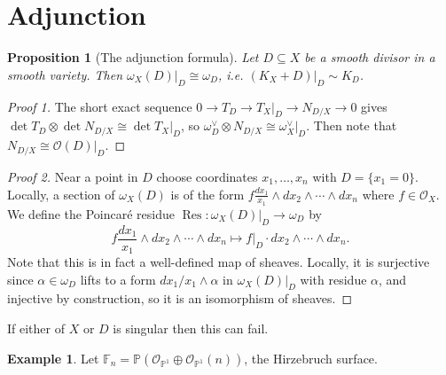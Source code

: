 \documentclass{article}
\newtheorem*{proposition}{Proposition}
\theoremstyle{definition}
\newtheorem*{example}{Example}
\DeclareMathOperator{\Res}{Res}
\renewcommand{\O}{\mathcal{O}}
\renewcommand{\P}{\mathbb{P}}
\newcommand{\F}{\mathbb{F}}
\begin{document}
\section*{Adjunction}

\begin{proposition}[The adjunction formula]
    Let $D\subseteq X$ be a smooth divisor in a smooth variety. Then
    $\omega_X(D)|_D\cong\omega_D$, i.e. $(K_X+D)|_D\sim K_D$.
\end{proposition}

\begin{proof}[Proof 1]
    The short exact sequence $0\to T_D\to T_X|_D\to N_{D/X}\to0$ gives
    $\det T_D\otimes\det N_{D/X}\cong\det T_X|_D$, so
    $\omega_D^\vee\otimes N_{D/X}\cong \omega_X^\vee|_D$. Then note that
    $N_{D/X}\cong\O(D)|_D$.
\end{proof}

\begin{proof}[Proof 2]
    Near a point in $D$ choose coordinates $x_1,\ldots,x_n$ with $D=\{x_1=0\}$.
    Locally, a section of $\omega_X(D)$ is of the form
    $f\frac{dx_1}{x_1}\wedge dx_2\wedge\cdots\wedge dx_n$ where $f\in\O_X$. We
    define the Poincar\'e residue $\Res:\omega_X(D)|_D\to\omega_D$ by
    \begin{equation*}
        f\frac{dx_1}{x_1}\wedge dx_2\wedge\cdots\wedge dx_n
            \mapsto f|_D\cdot dx_2\wedge\cdots\wedge dx_n.
    \end{equation*}
    Note that this is in fact a well-defined map of sheaves. Locally, it is
    surjective since $\alpha\in\omega_D$ lifts to a form $dx_1/x_1\wedge\alpha$
    in $\omega_X(D)|_D$ with residue $\alpha$, and injective by construction, so
    it is an isomorphism of sheaves.
\end{proof}

If either of $X$ or $D$ is singular then this can fail.

\begin{example}
    Let $\F_n=\P(\O_{\P^1}\oplus\O_{\P^1}(n))$, the Hirzebruch surface.
\end{example}
\end{document}
